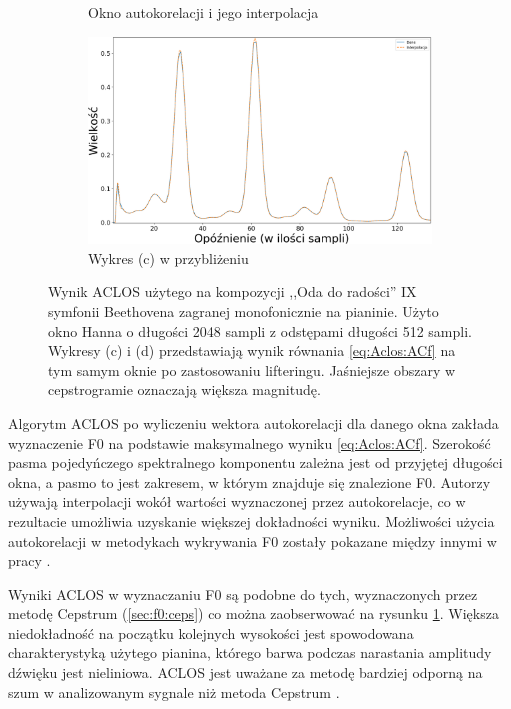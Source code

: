 \documentclass[12pt,a4paper,twoside]{mwart}
\begin{document}
\begin{figure}[ht]
\begin{subfigure}{0.5\textwidth}
    \caption{Okno autokorelacji i jego interpolacja}
  \end{subfigure}
  \begin{subfigure}{0.49\textwidth}
    \centering
    \includegraphics[width=1.\linewidth]{images/ACLOS/Interpolacja_superzoomed_cropped.png}
    \caption{Wykres (c) w przybliżeniu}
  \end{subfigure}
  \caption{Wynik ACLOS użytego na kompozycji ,,Oda do radości'' IX symfonii Beethovena zagranej monofonicznie na pianinie. Użyto okno Hanna o długości 2048 sampli z odstępami długości 512 sampli. Wykresy (c) i (d) przedstawiają wynik równania \ref{eq:Aclos:ACf} na tym samym oknie po zastosowaniu lifteringu. Jaśniejsze obszary w cepstrogramie oznaczają większa magnitudę.}
  \label{fig:aclos:results}
\end{figure}

Algorytm ACLOS po wyliczeniu wektora autokorelacji dla danego okna zakłada wyznaczenie F0 na podstawie maksymalnego wyniku \ref{eq:Aclos:ACf}. Szerokość pasma pojedyńczego spektralnego komponentu zależna jest od przyjętej długości okna, a pasmo to jest zakresem, w którym znajduje się znalezione F0. Autorzy używają interpolacji wokół wartości wyznaczonej przez autokorelacje, co w rezultacie umożliwia uzyskanie większej dokładności wyniku. Możliwości użycia autokorelacji w metodykach wykrywania F0 zostały pokazane między innymi w pracy 
\cite[1046-1047]{Transcription:Suzuki:EstimationOfMistunedFrequency}
.

Wyniki ACLOS w wyznaczaniu F0 są podobne do tych, wyznaczonych przez metodę Cepstrum (\ref{sec:f0:ceps}) co można zaobserwować na rysunku \ref{fig:aclos:results}. Większa niedokładność na początku kolejnych wysokości jest spowodowana charakterystyką użytego pianina, którego barwa podczas narastania amplitudy dźwięku jest nieliniowa. ACLOS jest uważane za metodę bardziej odporną na szum w analizowanym sygnale niż metoda Cepstrum \cite{Transcription:Kunieda:Aclos}.
\end{document}
